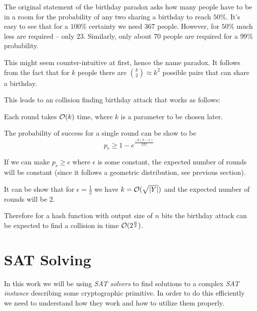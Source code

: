 The original statement of the birthday paradox asks how many people have to be in a room for the probability of any two sharing a birthday to reach $50\%$. 
It's easy to see that for a $100\%$ certainty we need $367$ people. However, for $50\%$ much less are required -- only $23$. Similarly, only about $70$ people are required for a $99\%$ probability.

This might seem counter-intuitive at first, hence the name paradox.
It follows from the fact that for $k$ people there are ${k \choose 2} \approx k^2$ possible pairs that can share a birthday.

This leads to an collision finding birthday attack that works as follows:

\begin{algorithm}
\begin{algorithmic}[1]
		 
			\State {}
		\EndIf
	\EndWhile
\end{algorithmic}
\end{algorithm}

Each round takes $\mathcal{O}(k)$ time, where $k$ is a parameter to be chosen later.

The probability of success for a single round can be show to be
\[
p_r \ge 1 - e^\frac{-k(k-1)}{2|Y|}
\]

If we can make $p_r \ge \epsilon$ where $\epsilon$ is some constant, the expected number of rounds will be constant (since it follows a geometric distribution, see previous section).

It can be show that for $\epsilon = \frac{1}{2}$ we have $k = \mathcal{O}(\sqrt{|Y|})$ and the expected number of rounds will be $2$.

Therefore for a hash function with output size of $n$ bits the birthday attack can be expected to find a collision in time $\mathcal{O}(2^\frac{n}{2})$.



\chapter{SAT Solving}

In this work we will be using \emph{SAT solvers} to find solutions to a complex \emph{SAT instance} describing some cryptographic primitive.
In order to do this efficiently we need to understand how they work and how to utilize them properly.

